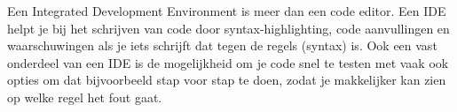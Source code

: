 Een Integrated Development Environment is meer dan een code editor. Een IDE helpt je bij het schrijven van code door syntax-highlighting, code aanvullingen en waarschuwingen als je iets schrijft dat tegen de regels (syntax) is. Ook een vast onderdeel van een IDE is de mogelijkheid om je code snel te testen met vaak ook opties om dat bijvoorbeeld stap voor stap te doen, zodat je makkelijker kan zien op welke regel het fout gaat.

